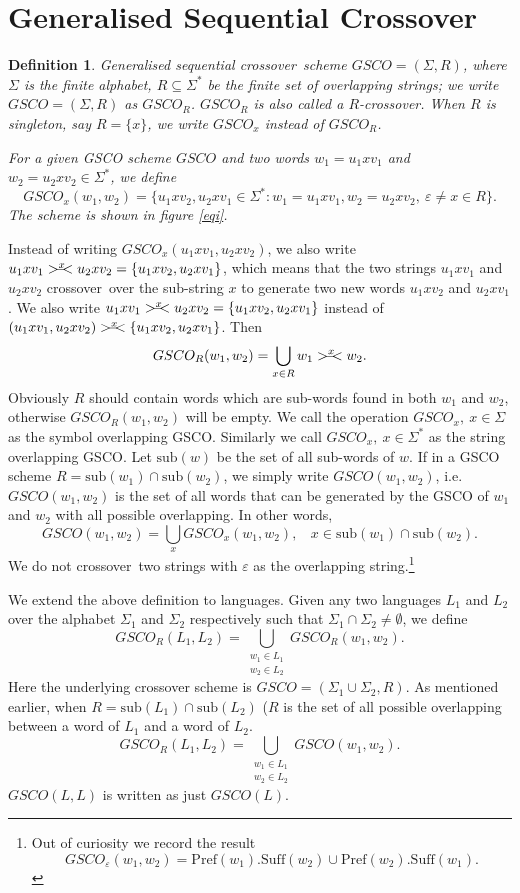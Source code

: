 \documentclass{llncs}
\newtheorem{defin}{Definition}
\newcommand{\sa}{crossover~}
\newcommand{\sae}{crossover~}
\newcommand{\sg}{\Sigma}
\newcommand{\ve}{\varepsilon}
\newcommand{\sub}{\mathrm{sub}}
\newcommand{\rs}{\hspace{-3.5mm}-\hspace{-2mm}<}
\begin{document}
\section{Generalised Sequential Crossover}
\begin{defin}
Generalised sequential \sa scheme $GSCO=(\sg,R)$, where $\sg$ is the
finite alphabet,
 $R\subseteq \sg^*$ be the finite set of overlapping strings; we write $GSCO=(\sg,R)$
 as $GSCO_R$. $GSCO_R$ is also called a $R$-crossover. When $R$ is singleton,
  say $R=\{x\}$, we write $GSCO_x$ instead of $GSCO_R$.


\par For a given GSCO scheme $GSCO$ and two words $w_1=u_1xv_1$ and $w_2=u_2xv_2\in \sg^*$,
 we define
\[GSCO_x(w_1,w_2)=\{u_1xv_2,u_2xv_1\in\sg^*:  w_1=u_1xv_1, w_2=u_2xv_2,~
\ve\neq x\in R\}.\]
The scheme is shown in figure \ref{eqi}.
\end{defin}
\par Instead of writing $GSCO_x(u_1xv_1, u_2xv_2)$, we also write
 $u_1xv_1>^x\rs u_2xv_2=\{ u_1xv_2,u_2xv_1\}$, which means that the two strings
  $u_1xv_1$ and $u_2xv_2$ \sae over the sub-string $x$ to generate two new
  words  $u_1xv_2$ and $u_2xv_1$. We also write $u_1xv_1>^x\rs u_2xv_2=\{u_1xv_2,u_2xv_1\}$
   instead of $(u_1xv_1,u_2xv_2)>^x\rs\{u_1xv_2,u_2xv_1\}$. Then
\[GSCO_R(w_1,w_2)=\bigcup_{x\in R}w_1>^x\rs w_2.\]
  Obviously $R$ should contain words which are sub-words found in both
  $w_1$ and $w_2$, otherwise $GSCO_R(w_1,w_2)$ will be empty. We call the operation
  $GSCO_x,~x\in\sg$ as the symbol overlapping GSCO. Similarly we call $GSCO_x,~x\in\sg^*$
  as the string overlapping GSCO. Let $\sub(w)$ be the set of all sub-words of $w$.
   If in a GSCO scheme $R=\sub(w_1)\cap\sub(w_2)$, we simply write $GSCO(w_1,w_2)$, i.e.
    $GSCO(w_1,w_2)$ is the set of all words that can be generated by the GSCO
     of $w_1$ and $w_2$ with all possible overlapping. In other words,
\[GSCO(w_1,w_2)= \bigcup_x GSCO_x(w_1,w_2),~~~~x\in\sub(w_1)\cap\sub(w_2).\]
We do not \sae two strings with $\ve$ as the overlapping string.\footnote{Out
of curiosity we record the result
\[GSCO_\ve(w_1,w_2)=\mathrm{Pref}(w_1).\mathrm{Suff}(w_2)\cup \mathrm{Pref}(w_2).
\mathrm{Suff}(w_1).\]}
\par We extend the above definition  to languages. Given any two languages $L_1$ and $L_2$ over the alphabet $\sg_1$ and $\sg_2$ respectively such that $\sg_1\cap\sg_2\neq\emptyset$, we define
\[GSCO_R(L_1,L_2)=\bigcup_{\substack{w_1\in L_1\\w_2\in L_2}}GSCO_R(w_1,w_2).\]
Here the underlying crossover scheme is $GSCO=(\sg_1\cup\sg_2,R)$.
As mentioned earlier, when  $R=\sub(L_1)\cap\sub(L_2)$ ($R$ is the
set of all possible overlapping between a word of \(L_1\) and a word
of \(L_2\).
\[GSCO_R(L_1,L_2)=\bigcup_{\substack{w_1\in L_1\\w_2\in L_2}}GSCO(w_1,w_2).\]
\(GSCO(L,L)\) is written as just \(GSCO(L)\).
\end{document}
